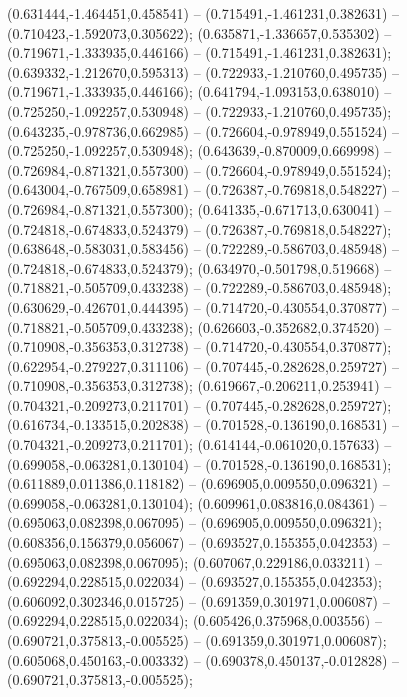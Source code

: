  (0.631444,-1.464451,0.458541) -- (0.715491,-1.461231,0.382631) -- (0.710423,-1.592073,0.305622);
 (0.635871,-1.336657,0.535302) -- (0.719671,-1.333935,0.446166) -- (0.715491,-1.461231,0.382631);
 (0.639332,-1.212670,0.595313) -- (0.722933,-1.210760,0.495735) -- (0.719671,-1.333935,0.446166);
 (0.641794,-1.093153,0.638010) -- (0.725250,-1.092257,0.530948) -- (0.722933,-1.210760,0.495735);
 (0.643235,-0.978736,0.662985) -- (0.726604,-0.978949,0.551524) -- (0.725250,-1.092257,0.530948);
 (0.643639,-0.870009,0.669998) -- (0.726984,-0.871321,0.557300) -- (0.726604,-0.978949,0.551524);
 (0.643004,-0.767509,0.658981) -- (0.726387,-0.769818,0.548227) -- (0.726984,-0.871321,0.557300);
 (0.641335,-0.671713,0.630041) -- (0.724818,-0.674833,0.524379) -- (0.726387,-0.769818,0.548227);
 (0.638648,-0.583031,0.583456) -- (0.722289,-0.586703,0.485948) -- (0.724818,-0.674833,0.524379);
 (0.634970,-0.501798,0.519668) -- (0.718821,-0.505709,0.433238) -- (0.722289,-0.586703,0.485948);
 (0.630629,-0.426701,0.444395) -- (0.714720,-0.430554,0.370877) -- (0.718821,-0.505709,0.433238);
 (0.626603,-0.352682,0.374520) -- (0.710908,-0.356353,0.312738) -- (0.714720,-0.430554,0.370877);
 (0.622954,-0.279227,0.311106) -- (0.707445,-0.282628,0.259727) -- (0.710908,-0.356353,0.312738);
 (0.619667,-0.206211,0.253941) -- (0.704321,-0.209273,0.211701) -- (0.707445,-0.282628,0.259727);
 (0.616734,-0.133515,0.202838) -- (0.701528,-0.136190,0.168531) -- (0.704321,-0.209273,0.211701);
 (0.614144,-0.061020,0.157633) -- (0.699058,-0.063281,0.130104) -- (0.701528,-0.136190,0.168531);
 (0.611889,0.011386,0.118182) -- (0.696905,0.009550,0.096321) -- (0.699058,-0.063281,0.130104);
 (0.609961,0.083816,0.084361) -- (0.695063,0.082398,0.067095) -- (0.696905,0.009550,0.096321);
 (0.608356,0.156379,0.056067) -- (0.693527,0.155355,0.042353) -- (0.695063,0.082398,0.067095);
 (0.607067,0.229186,0.033211) -- (0.692294,0.228515,0.022034) -- (0.693527,0.155355,0.042353);
 (0.606092,0.302346,0.015725) -- (0.691359,0.301971,0.006087) -- (0.692294,0.228515,0.022034);
 (0.605426,0.375968,0.003556) -- (0.690721,0.375813,-0.005525) -- (0.691359,0.301971,0.006087);
 (0.605068,0.450163,-0.003332) -- (0.690378,0.450137,-0.012828) -- (0.690721,0.375813,-0.005525);
